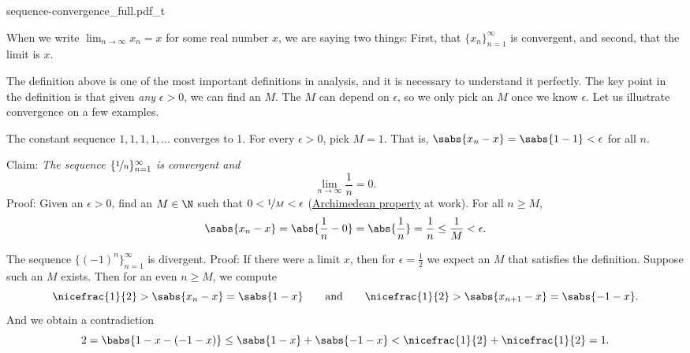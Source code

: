 \begin{myfigureht}
{sequence-convergence_full.pdf_t}
\caption{Illustration of convergence.
On top, we show the first ten points of the sequence as a graph
with $M$ and the interval around the limit $x$ marked.
On bottom, the points of the same sequence are marked on the
number line.\label{figsequenceconvergence}}
\end{myfigureht}

When we write $\lim_{n\to\infty} x_n = x$ for some real number $x$, we are saying two
things: First, that $\{ x_n \}_{n=1}^\infty$ is convergent, and second, that the limit is
$x$.

The definition above is one of the most important definitions in analysis,
and it is necessary to understand it perfectly.  The key point in the
definition is that given \emph{any} $\epsilon > 0$, we can find an $M$.  The
$M$ can depend on $\epsilon$, so we only pick an $M$ once we know
$\epsilon$.  Let us illustrate convergence on a few examples.

\begin{example}
The constant sequence $1,1,1,1,\ldots$ converges to 1.  For
every $\epsilon > 0$, pick $M = 1$.  That is, $\sabs{x_n-x} = \sabs{1-1} < \epsilon$ for all $n$.
\end{example}

\begin{example}
Claim: \emph{The sequence $\{ \nicefrac{1}{n} \}_{n=1}^\infty$ is convergent and}
\begin{equation*}
\lim_{n\to \infty} \frac{1}{n} = 0 .
\end{equation*}
Proof: Given an $\epsilon > 0$, find an $M \in \N$ such that
$0 < \nicefrac{1}{M} < \epsilon$
(\hyperref[thm:arch:i]{Archimedean property} at work).
For all $n \geq M$,
\begin{equation*}
\sabs{x_n - x}
=
\abs{\frac{1}{n} - 0} = \abs{\frac{1}{n}} = \frac{1}{n} \leq \frac{1}{M} < \epsilon .
\end{equation*}
\end{example}

\begin{example}
The sequence $\bigl\{ {(-1)}^n \bigr\}_{n=1}^\infty$ is divergent.  Proof: If there
were a limit $x$, then for $\epsilon = \frac{1}{2}$ we expect an $M$ that
satisfies the definition.  Suppose
such an $M$ exists.
Then for an even $n \geq M$, we compute
\begin{equation*}
\nicefrac{1}{2} > \sabs{x_n - x}  = \sabs{1 - x}
\qquad \text{and} \qquad
\nicefrac{1}{2} > \sabs{x_{n+1} - x}  = \sabs{-1 - x} .
\end{equation*}
And we obtain a contradiction
\begin{equation*}
2 = \babs{1 - x - (-1 -x)} \leq
\sabs{1 - x} + \sabs{-1 -x} < \nicefrac{1}{2} + \nicefrac{1}{2} = 1 .
\end{equation*}
\end{example}

